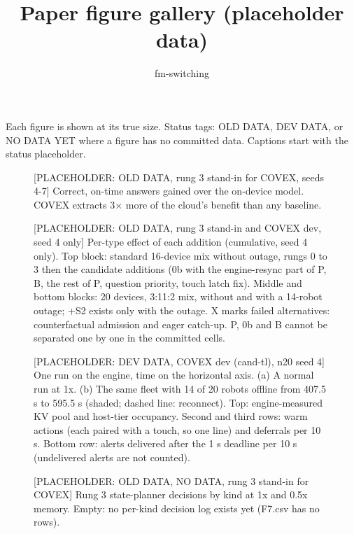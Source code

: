 \documentclass[sigconf]{acmart}
\begin{document}
\title{Paper figure gallery (placeholder data)}
\author{fm-switching}
\maketitle
\noindent Each figure is shown at its true size. Status tags: OLD DATA, DEV DATA, or NO DATA YET where a figure
has no committed data. Captions start with the status placeholder.
\begin{figure}[t]
\centering
{\selectfont
}
\caption{[PLACEHOLDER: OLD DATA, rung 3 stand-in for COVEX, seeds 4-7] Correct, on-time answers gained over the on-device model. COVEX extracts 3$\times$ more of the cloud's benefit than any baseline.}
\label{fig:F01_intro_teaser}
\end{figure}
\clearpage
\begin{figure}[t]
\centering
{\selectfont
}
\caption{[PLACEHOLDER: OLD DATA, rung 3 stand-in and COVEX dev, seed 4 only] Per-type effect of each addition (cumulative, seed 4 only). Top block: standard 16-device mix without outage, rungs 0 to 3 then the candidate additions (0b with the engine-resync part of P, B, the rest of P, question priority, touch latch fix). Middle and bottom blocks: 20 devices, 3:11:2 mix, without and with a 14-robot outage; +S2 exists only with the outage. X marks failed alternatives: counterfactual admission and eager catch-up. P, 0b and B cannot be separated one by one in the committed cells.}
\label{fig:F05_ablation_ladder}
\end{figure}
\clearpage
\begin{figure}[t]
\centering
{\selectfont
}
\caption{[PLACEHOLDER: DEV DATA, COVEX dev (cand-tl), n20 seed 4] One run on the engine, time on the horizontal axis. (a) A normal run at 1x. (b) The same fleet with 14 of 20 robots offline from 407.5 s to 595.5 s (shaded; dashed line: reconnect). Top: engine-measured KV pool and host-tier occupancy. Second and third rows: warm actions (each paired with a touch, so one line) and deferrals per 10 s. Bottom row: alerts delivered after the 1 s deadline per 10 s (undelivered alerts are not counted).}
\label{fig:F06_timeline}
\end{figure}
\clearpage
\begin{figure}[t]
\centering
{\selectfont
}
\caption{[PLACEHOLDER: OLD DATA, NO DATA, rung 3 stand-in for COVEX] Rung 3 state-planner decisions by kind at 1x and 0.5x memory. Empty: no per-kind decision log exists yet (F7.csv has no rows).}
\label{fig:F07_planner_decisions}
\end{figure}
\end{document}
